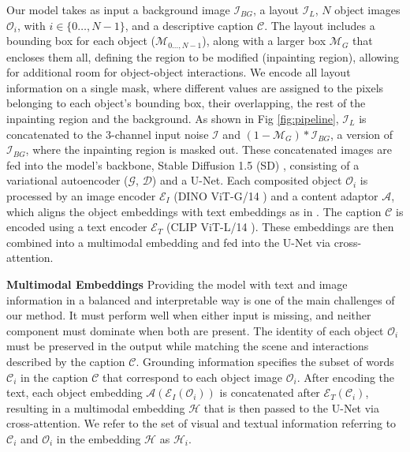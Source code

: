 Our model takes as input a background image $\mathcal{I}_{BG}$, a layout $\mathcal{I}_{L}$, $N$ object images $\mathcal{O}_{i}$, with $i \in \{0 \dots, N-1\}$, and a descriptive caption $\mathcal{C}$. The layout includes a bounding box for each object ($\mathcal{M}_{0 \dots, N-1}$), along with a larger box $\mathcal{M}_{G}$ that encloses them all, defining  the region to be modified (inpainting region), allowing for additional room for object-object interactions. %
We encode all layout information on a single mask, where different values are assigned to the pixels belonging to each object's bounding box, their overlapping, the rest of the inpainting region and the background. As shown in Fig \ref{fig:pipeline}, $\mathcal{I}_{L}$ is concatenated to the 3-channel input noise $\mathcal{I}$ and $(1-\mathcal{M}_{G})*\mathcal{I}_{BG}$, a version of $\mathcal{I}_{BG}$, where the inpainting region is masked out. These concatenated images are fed into the model's backbone, Stable Diffusion 1.5 (SD) \cite{rombach2022ldm}, consisting of a variational autoencoder ($\mathcal{G}$, $\mathcal{D}$) and a U-Net. Each composited object $\mathcal{O}_{i}$ is processed by an image encoder $\mathcal{E}_{I}$ (DINO ViT-G/14 \cite{oquab2023dinov2}) and a content adaptor $\mathcal{A}$, which aligns the object embeddings with text embeddings as in \cite{song2022objectstitch}. The caption $\mathcal{C}$ is encoded using a text encoder $\mathcal{E}_{T}$ (CLIP ViT-L/14 \cite{radford2021clip}). These embeddings are then combined into a multimodal embedding and fed into the U-Net via cross-attention.

\noindent
\textbf{Multimodal Embeddings} Providing the model with text and image information in a balanced and interpretable way is one of the main challenges of our method. It must perform well when either input is missing, and neither component must dominate when both are present. The identity of each object $\mathcal{O}_{i}$ must be preserved in the output while matching the scene and interactions described by the caption $\mathcal{C}$. Grounding information specifies the subset of words $\mathcal{C}_{i}$ in the caption $\mathcal{C}$ that correspond to each object image $\mathcal{O}_{i}$. After encoding the text, each object embedding $\mathcal{A}(\mathcal{E}_{I}(\mathcal{O}_{i}))$ is concatenated after $\mathcal{E}_{T}(\mathcal{C}_{i})$, resulting in a multimodal embedding $\mathcal{H}$ that is then passed to the U-Net via cross-attention. We refer to the set of visual and textual information referring to $\mathcal{C}_i$ and $\mathcal{O}_i$ in the embedding $\mathcal{H}$ as $\mathcal{H}_i$.




